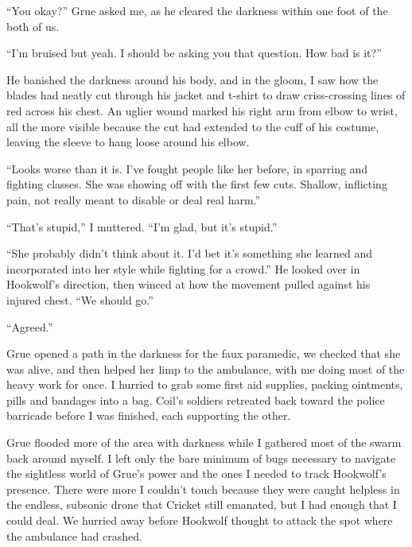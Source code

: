 ``You okay?'' Grue asked me, as he cleared the darkness within one foot of the both of us.



``I'm bruised but yeah.  I should be asking you that question.  How bad is it?''



He banished the darkness around his body, and in the gloom, I saw how the blades had neatly cut through his jacket and t-shirt to draw criss-crossing lines of red across his chest.  An uglier wound marked his right arm from elbow to wrist, all the more visible because the cut had extended to the cuff of his costume, leaving the sleeve to hang loose around his elbow.



``Looks worse than it is.  I've fought people like her before, in sparring and fighting classes.  She was showing off with the first few cuts.  Shallow, inflicting pain, not really meant to disable or deal real harm.''



``That's stupid,'' I muttered.  ``I'm glad, but it's stupid.''



``She probably didn't think about it.  I'd bet it's something she learned and incorporated into her style while fighting for a crowd.''  He looked over in Hookwolf's direction, then winced at how the movement pulled against his injured chest.  ``We should go.''



``Agreed.''



Grue opened a path in the darkness for the faux paramedic, we checked that she was alive, and then helped her limp to the ambulance, with me doing most of the heavy work for once.  I hurried to grab some first aid supplies, packing ointments, pills and bandages into a bag.  Coil's soldiers retreated back toward the police barricade before I was finished, each supporting the other.



Grue flooded more of the area with darkness while I gathered most of the swarm back around myself.  I left only the bare minimum of bugs necessary to navigate the sightless world of Grue's power and the ones I needed to track Hookwolf's presence.  There were more I couldn't touch because they were caught helpless in the endless, subsonic drone that Cricket still emanated, but I had enough that I could deal.  We hurried away before Hookwolf thought to attack the spot where the ambulance had crashed.



